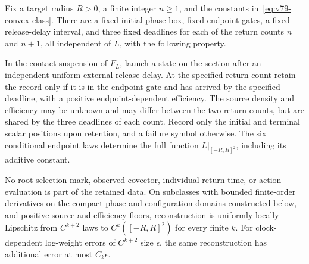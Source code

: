 \begin{theorem}
\label{thm:v79-six-clock}
Fix a target radius $R>0$, a finite integer $n\ge1$, and the constants
in~\eqref{eq:v79-convex-class}.  There are a fixed initial phase box,
fixed endpoint gates, a fixed release-delay interval, and three fixed
deadlines for each of the return counts $n$ and $n+1$, all independent
of $L$, with the following property.

In the contact suspension of $F_L$, launch a state on the section after
an independent uniform external release delay.  At the specified return
count retain the record only if it is in the endpoint gate and has
arrived by the specified deadline, with a positive endpoint-dependent
efficiency.  The source density and efficiency may be unknown and may
differ between the two return counts, but are shared by the three
deadlines of each count.  Record only the initial and terminal scalar
positions upon retention, and a failure symbol otherwise.  The six
conditional endpoint laws determine the full function
$L|_{[-R,R]^2}$, including its additive constant.

No root-selection mark, observed covector, individual return time,
or action evaluation is part of the retained data.  On subclasses with
bounded finite-order derivatives on the compact phase and configuration
domains constructed below, and positive source and efficiency floors,
reconstruction is uniformly locally Lipschitz from $C^{k+2}$ laws to
$C^k([-R,R]^2)$ for every finite $k$.  For clock-dependent log-weight
errors of $C^{k+2}$ size $\epsilon$, the same reconstruction has
additional error at most $C_k\epsilon$.
\end{theorem}
